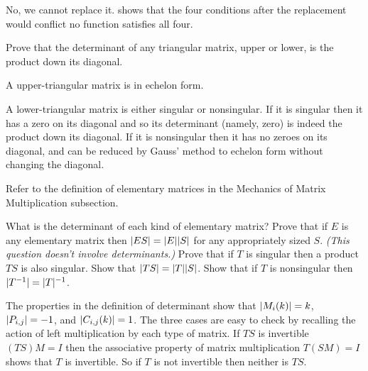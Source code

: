\begin{exercises}
     \begin{answer}
       No, we cannot replace it.
       shows that the four conditions after the replacement would  
       conflict \Dash  no function satisfies all four.
     \end{answer}
  \item 
    Prove that the determinant of any triangular matrix, upper or lower,
    is the product down its diagonal.
    \begin{answer}
      A upper-triangular matrix is in echelon form.

      A lower-triangular matrix is either singular or nonsingular.
      If it is singular then it has a zero on its diagonal and so its 
      determinant (namely, zero) is indeed the product down its diagonal. 
      If it is nonsingular then it has no zeroes on its diagonal, and
      can be reduced by Gauss' method to echelon
      form without changing the diagonal.  
    \end{answer}
  \item
    Refer to the definition of elementary matrices in the Mechanics
    of Matrix Multiplication subsection.
    \begin{exparts}
      \partsitem What is the determinant of each kind of elementary matrix?
      \partsitem Prove that if \( E \) is any elementary matrix then
        \( \deter{ES}=\deter{E}\deter{S} \) for any appropriately sized
        \( S \).
      \partsitem \textit{(This question doesn't involve determinants.)}
        Prove that if \( T \) is singular then a product \( TS \) is
        also singular.
      \partsitem Show that \( \deter{TS}=\deter{T}\deter{S} \).
      \partsitem Show that if \( T \) is nonsingular then
          \( \deter{T^{-1}}=\deter{T}^{-1} \).
    \end{exparts}
    \begin{answer}
      \begin{exparts}
        \partsitem The properties in the definition of determinant 
          show that 
          \( \deter{M_i(k)}=k \),
          \( \deter{P_{i,j}}=-1 \),
          and
          \( \deter{C_{i,j}(k)}=1 \).
        \partsitem The three cases are easy to check by recalling the action
          of left multiplication by each type of matrix.
        \partsitem If \( TS \) is invertible \( (TS)M=I \) then
          the associative property of matrix multiplication 
          \( T(SM)=I \) shows that \( T \) is invertible.
          So if \( T \) is not invertible then neither is \( TS \).

\end{exparts}
\end{answer}
\end{exercises}
